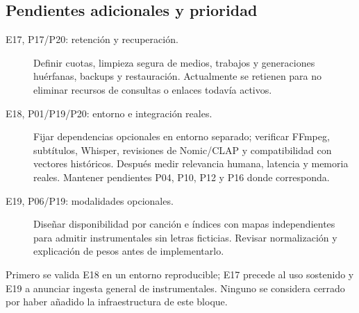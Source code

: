 \subsection{Pendientes adicionales y prioridad}
\begin{description}
\item[E17, P17/P20: retención y recuperación.] Definir cuotas, limpieza segura de
medios, trabajos y generaciones huérfanas, backups y restauración. Actualmente se
retienen para no eliminar recursos de consultas o enlaces todavía activos.
\item[E18, P01/P19/P20: entorno e integración reales.] Fijar dependencias opcionales
en entorno separado; verificar FFmpeg, subtítulos, Whisper, revisiones de Nomic/CLAP
y compatibilidad con vectores históricos. Después medir relevancia humana,
latencia y memoria reales. Mantener pendientes P04, P10, P12 y P16 donde corresponda.
\item[E19, P06/P19: modalidades opcionales.] Diseñar disponibilidad por canción e
índices con mapas independientes para admitir instrumentales sin letras ficticias.
Revisar normalización y explicación de pesos antes de implementarlo.
\end{description}
Primero se valida E18 en un entorno reproducible; E17 precede al uso sostenido y
E19 a anunciar ingesta general de instrumentales. Ninguno se considera cerrado
por haber añadido la infraestructura de este bloque.
